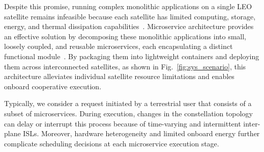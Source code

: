 \documentclass[10pt, conference, letterpaper]{IEEEtran}
\begin{document}

Despite this promise, running complex monolithic applications on a single LEO satellite remains infeasible because each satellite has limited computing, storage, energy, and thermal dissipation capabilities~\cite{leyva2023satellite,joint_orbit_comp_comm4data_Download}.
Microservice architecture provides an effective solution by decomposing these monolithic applications into small, loosely coupled, and reusable microservices, each encapsulating a distinct functional module~\cite{3D_assets_microservice}.
By packaging them into lightweight containers and deploying them across interconnected satellites, as shown in Fig.~\ref{fig:sys_scenario}, this architecture alleviates individual satellite resource limitations and enables onboard cooperative execution.

Typically, we consider a request initiated by a terrestrial user that consists of a subset of microservices. During execution, changes in the constellation topology can delay or interrupt this process because of time-varying and intermittent inter-plane ISLs. Moreover, hardware heterogeneity and limited onboard energy further complicate scheduling decisions at each microservice execution stage.
\end{document}
